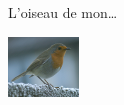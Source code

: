 \documentclass[a4paper,12pt]{report}
\begin{document}
L'oiseau de mon\dots
\begin{center}
\includegraphics{oiseau}
\end{center}
\end{document}
